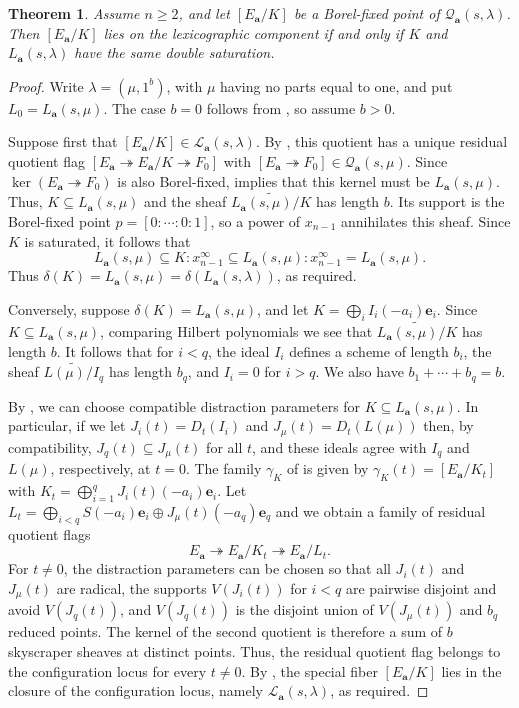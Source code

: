 \documentclass[leqno,11pt,a4paper]{amsart}
\newtheorem{thm}{Theorem}[section]
\theoremstyle{definition}
\numberwithin{equation}{section}
\newcommand{\bfa}{\mathbf{a}}
\newcommand{\bfe}{\mathbf{e}}
\newcommand{\LL}{\mathcal{L}}
\newcommand{\QQ}{\mathcal{Q}}
\begin{document}
\begin{thm}\label{double_saturation}
Assume $n\geq2$, and let $[E_{\bfa}/K]$ be a Borel-fixed point of $\QQ_{\bfa}(s,\lambda)$. 
Then $[E_{\bfa}/K]$ lies on the lexicographic component if and only if $K$ and $L_{\bfa}(s,\lambda)$ have the same double saturation.
\end{thm}

\begin{proof}
Write $\lambda=(\mu,1^b)$, with $\mu$ having no parts equal to one, and put $L_0=L_{\bfa}(s,\mu)$.
The case $b=0$ follows from , so assume $b>0$.

Suppose first that $[E_{\bfa}/K]\in\LL_{\bfa}(s,\lambda)$.
By , this quotient has a unique residual quotient flag 
$[E_{\bfa} \twoheadrightarrow E_{\bfa}/K \twoheadrightarrow F_0]$ with $[E_{\bfa} \twoheadrightarrow F_0] \in \QQ_{\bfa}(s,\mu)$.
Since $\ker(E_{\bfa} \twoheadrightarrow F_0)$ is also Borel-fixed,   implies that this kernel must be $L_{\bfa}(s,\mu)$. 
Thus, $K\subseteq L_{\bfa}(s,\mu)$ and the sheaf $\widetilde{L_{\bfa}(s,\mu)/K}$ has length $b$.
Its support is the Borel-fixed point $p=[0:\cdots:0:1]$, so a power of $x_{n-1}$ annihilates this sheaf.
Since $K$ is saturated, it follows that
$$
L_{\bfa}(s,\mu) \subseteq K:x_{n-1}^\infty \subseteq L_{\bfa}(s,\mu):x_{n-1}^\infty = L_{\bfa}(s,\mu).
$$
Thus $\delta(K) = L_{\bfa}(s,\mu) = \delta(L_{\bfa}(s,\lambda))$, as required.

Conversely, suppose $\delta(K)=L_{\bfa}(s,\mu)$, and let $K=\bigoplus_i I_i(-a_i)\bfe_i$.
Since $K \subseteq L_{\bfa}(s,\mu)$, comparing Hilbert polynomials we see that $\widetilde{L_{\bfa}(s,\mu)/K}$ has length $b$.
It follows that for $i<q$, the ideal $I_i$ defines a scheme of length $b_i$, the sheaf $\widetilde{L(\mu)/I_q}$ has length $b_q$, and $I_i=0$ for $i>q$. 
We also have  $b_1 + \cdots + b_q=b$.


By , we can choose compatible distraction parameters for $K\subseteq L_{\bfa}(s,\mu)$. 
In particular, if we let $J_i(t)=D_t(I_i)$ and $J_\mu(t)=D_t(L(\mu))$ then, by compatibility, $J_q(t)\subseteq J_\mu(t)$ for all $t$, and these ideals agree with $I_q$ and $L(\mu)$, respectively, at $t=0$. 
The family $\gamma_K$ of  is given by $\gamma_K(t)=[E_{\bfa}/K_t]$ with $K_t=\bigoplus_{i=1}^q J_i(t)(-a_i)\bfe_i$.
Let $L_t = \bigoplus_{i<q}S(-a_i)\bfe_i \oplus J_\mu(t)(-a_q)\bfe_q$ and we obtain a family of
residual quotient flags
$$
E_{\bfa}\twoheadrightarrow E_{\bfa}/K_t \twoheadrightarrow E_{\bfa}/L_t.
$$
For $t\ne0$, the distraction parameters can be chosen so that all $J_i(t)$ and $J_\mu(t)$ are radical, the supports $V(J_i(t))$ for $i<q$ are pairwise disjoint and avoid $V(J_q(t))$, and $V(J_q(t))$ is the disjoint union of $V(J_\mu(t))$ and $b_q$ reduced points.
The kernel of the second quotient is therefore a sum of $b$ skyscraper sheaves at distinct points.
Thus, the residual quotient flag belongs to the configuration locus for every $t\ne0$. By , the special fiber $[E_\bfa/K]$ lies in the closure of the configuration locus, namely $\LL_{\bfa}(s,\lambda)$, as required.
\end{proof}
\end{document}
